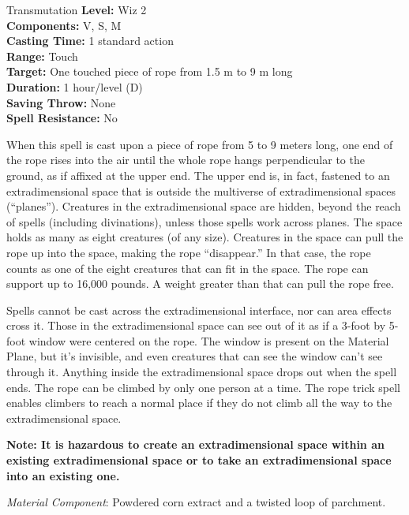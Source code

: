 {Transmutation}
{
	\textbf{Level:}
	Wiz 2\\
	\textbf{Components:}
	V, S, M\\
	\textbf{Casting Time:}
	1 standard action\\
	\textbf{Range:}
	Touch\\
	\textbf{Target:}
	One touched piece of rope from 1.5 m to 9 m long\\
	\textbf{Duration:}
	1 hour/level (D)\\
	\textbf{Saving Throw:}
	None\\
	\textbf{Spell Resistance:}
	No\\
}
{
	When this spell is cast upon a piece of rope from 5 to 9 meters long, one end of the rope rises into the air until the whole rope hangs perpendicular to the ground, as if affixed at the upper end. The upper end is, in fact, fastened to an extradimensional space that is outside the multiverse of extradimensional spaces (``planes''). Creatures in the extradimensional space are hidden, beyond the reach of spells (including divinations), unless those spells work across planes. The space holds as many as eight creatures (of any size). Creatures in the space can pull the rope up into the space, making the rope ``disappear.'' In that case, the rope counts as one of the eight creatures that can fit in the space. The rope can support up to 16,000 pounds. A weight greater than that can pull the rope free.

	Spells cannot be cast across the extradimensional interface, nor can area effects cross it. Those in the extradimensional space can see out of it as if a 3-foot by 5-foot window were centered on the rope. The window is present on the Material Plane, but it's invisible, and even creatures that can see the window can't see through it. Anything inside the extradimensional space drops out when the spell ends. The rope can be climbed by only one person at a time. The rope trick spell enables climbers to reach a normal place if they do not climb all the way to the extradimensional space.

	\textbf{Note: It is hazardous to create an extradimensional space within an existing extradimensional space or to take an extradimensional space into an existing one.}

	\textit{Material Component}:
	Powdered corn extract and a twisted loop of parchment.

}
